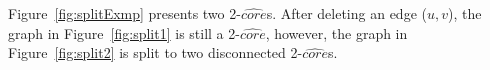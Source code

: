 \begin{example}
\label{ep:delete}
Figure~\ref{fig:splitExmp} presents two 2-$\widehat{core}$s. After deleting an edge ($u,v$), the graph in Figure~\ref{fig:split1} is still a 2-$\widehat{core}$, however, the graph in Figure~\ref{fig:split2} is split to two disconnected 2-$\widehat{core}$s. 
\end{example}

\begin{figure}[ht]
    \centering
    \mbox{
        }
\end{figure}
